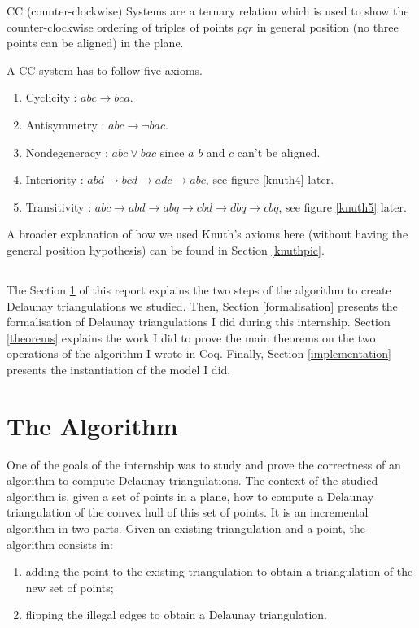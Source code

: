 \documentclass[a4paper,10pt]{article}
\begin{document}
CC (counter-clockwise) Systems are a ternary relation which is used to show the counter-clockwise ordering of triples of points $pqr$ in general position (no three points can be aligned) in the plane.

A CC system has to follow five axioms.
\begin{enumerate}
\item Cyclicity : $abc \rightarrow bca$.
\item Antisymmetry : $abc\rightarrow \neg bac$.
\item Nondegeneracy : $abc \vee bac$ since $a$ $b$ and $c$ can't be aligned.
\item Interiority : $abd \rightarrow bcd \rightarrow adc \rightarrow abc$, see figure \ref{knuth4} later.
\item Transitivity : $ abc \rightarrow abd \rightarrow abq \rightarrow cbd \rightarrow dbq \rightarrow cbq $, see figure \ref{knuth5} later.
\end{enumerate}

A broader explanation of how we used Knuth's axioms here (without having the general position hypothesis) can be found in Section \ref{knuthpic}.

\subsection*{}
The Section \ref{algo} of this report explains the two steps of the algorithm to create Delaunay triangulations we studied. Then, Section \ref{formalisation} presents the formalisation of Delaunay triangulations I did during this internship. Section \ref{theorems} explains the work I did to prove the main theorems on the two operations of the algorithm I wrote in {\sc Coq}. Finally, Section \ref{implementation} presents the instantiation of the model I did.

\section{The Algorithm}
\label{algo}
One of the goals of the internship was to study and prove the correctness of an algorithm to compute Delaunay triangulations. The context of the studied algorithm is, given a set of points in a plane, how to compute a Delaunay triangulation of the convex hull of this set of points. It is an incremental algorithm in two parts. Given an existing triangulation and a point, the algorithm consists in:
\begin{enumerate}
\item adding the point to the existing triangulation to obtain a triangulation of the new set of points;
\item flipping the illegal edges to obtain a Delaunay triangulation.
\end{enumerate}
\end{document}
